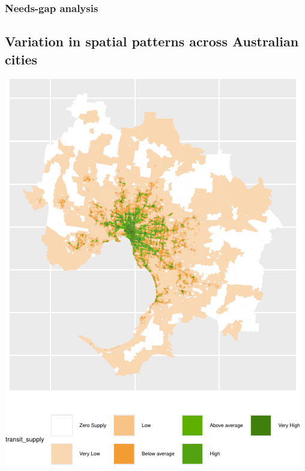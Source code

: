 \documentclass[preprint, 3p,
authoryear]{elsarticle} %
\begin{document}
\subsubsection{Needs-gap analysis}\label{needs-gap-analysis}

\subsection{Variation in spatial patterns across Australian
cities}\label{variation-in-spatial-patterns-across-australian-cities}

\includegraphics{Leveraging_GTFS_to_assess_transit_supply_Transport_Geography_files/figure-latex/Australian_cities_2021-1.pdf}
\end{document}
